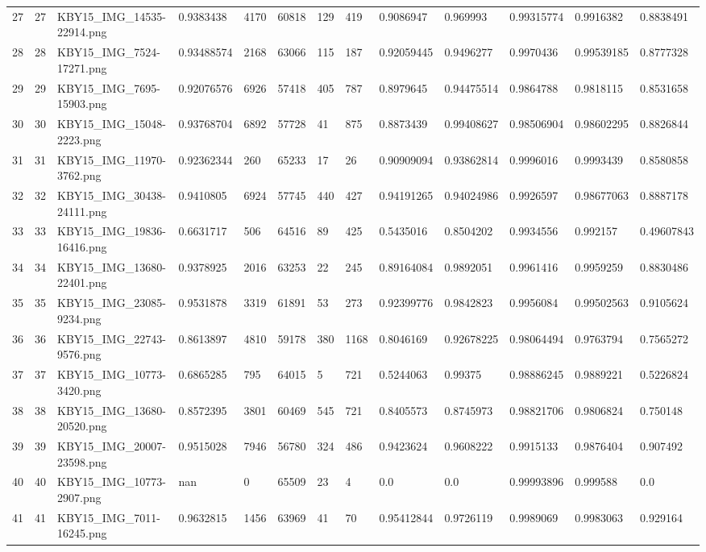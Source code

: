 \documentclass[11pt, a4paper, twoside]{report}
\begin{document}
\begin{longtable}[c]{@{}lllllllllllll@{}}
27 & 27 & KBY15\_IMG\_14535-22914.png & 0.9383438 & 4170 & 60818 & 129 & 419 & 0.9086947 & 0.969993 & 0.99315774 & 0.9916382 & 0.8838491 \\
28 & 28 & KBY15\_IMG\_7524-17271.png & 0.93488574 & 2168 & 63066 & 115 & 187 & 0.92059445 & 0.9496277 & 0.9970436 & 0.99539185 & 0.8777328 \\
29 & 29 & KBY15\_IMG\_7695-15903.png & 0.92076576 & 6926 & 57418 & 405 & 787 & 0.8979645 & 0.94475514 & 0.9864788 & 0.9818115 & 0.8531658 \\
30 & 30 & KBY15\_IMG\_15048-2223.png & 0.93768704 & 6892 & 57728 & 41 & 875 & 0.8873439 & 0.99408627 & 0.98506904 & 0.98602295 & 0.8826844 \\
31 & 31 & KBY15\_IMG\_11970-3762.png & 0.92362344 & 260 & 65233 & 17 & 26 & 0.90909094 & 0.93862814 & 0.9996016 & 0.9993439 & 0.8580858 \\
32 & 32 & KBY15\_IMG\_30438-24111.png & 0.9410805 & 6924 & 57745 & 440 & 427 & 0.94191265 & 0.94024986 & 0.9926597 & 0.98677063 & 0.8887178 \\
33 & 33 & KBY15\_IMG\_19836-16416.png & 0.6631717 & 506 & 64516 & 89 & 425 & 0.5435016 & 0.8504202 & 0.9934556 & 0.992157 & 0.49607843 \\
34 & 34 & KBY15\_IMG\_13680-22401.png & 0.9378925 & 2016 & 63253 & 22 & 245 & 0.89164084 & 0.9892051 & 0.9961416 & 0.9959259 & 0.8830486 \\
35 & 35 & KBY15\_IMG\_23085-9234.png & 0.9531878 & 3319 & 61891 & 53 & 273 & 0.92399776 & 0.9842823 & 0.9956084 & 0.99502563 & 0.9105624 \\
36 & 36 & KBY15\_IMG\_22743-9576.png & 0.8613897 & 4810 & 59178 & 380 & 1168 & 0.8046169 & 0.92678225 & 0.98064494 & 0.9763794 & 0.7565272 \\
37 & 37 & KBY15\_IMG\_10773-3420.png & 0.6865285 & 795 & 64015 & 5 & 721 & 0.5244063 & 0.99375 & 0.98886245 & 0.9889221 & 0.5226824 \\
38 & 38 & KBY15\_IMG\_13680-20520.png & 0.8572395 & 3801 & 60469 & 545 & 721 & 0.8405573 & 0.8745973 & 0.98821706 & 0.9806824 & 0.750148 \\
39 & 39 & KBY15\_IMG\_20007-23598.png & 0.9515028 & 7946 & 56780 & 324 & 486 & 0.9423624 & 0.9608222 & 0.9915133 & 0.9876404 & 0.907492 \\
40 & 40 & KBY15\_IMG\_10773-2907.png & nan & 0 & 65509 & 23 & 4 & 0.0 & 0.0 & 0.99993896 & 0.999588 & 0.0 \\
41 & 41 & KBY15\_IMG\_7011-16245.png & 0.9632815 & 1456 & 63969 & 41 & 70 & 0.95412844 & 0.9726119 & 0.9989069 & 0.9983063 & 0.929164 \\

\end{longtable}
\end{document}
